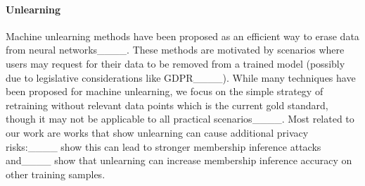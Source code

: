 \vspace{-1em}
\paragraph{Unlearning} 
Machine unlearning methods have been proposed as an efficient way to erase data from neural networks____. These methods are motivated by scenarios where users may request for their data to be removed from a trained model (possibly due to legislative considerations like GDPR____). While many techniques have been proposed for machine unlearning, we focus on the simple strategy of retraining without relevant data points which is the current gold standard, though it may not be applicable to all practical scenarios____. Most related to our work are works that show unlearning can cause additional privacy risks:____ show this can lead to stronger membership inference attacks and____ show that unlearning can increase membership inference accuracy on other training samples.